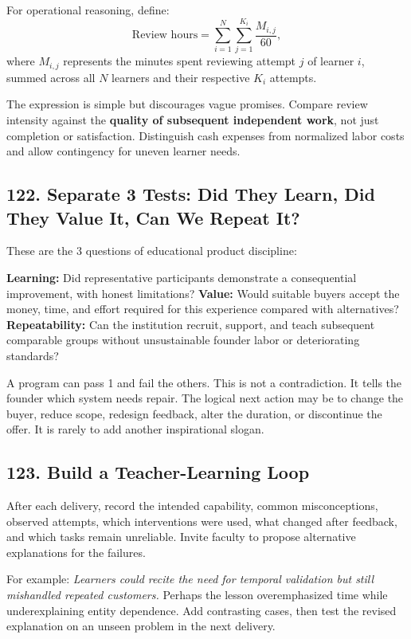 For operational reasoning, define:
\begin{equation}
\text{Review hours} = \sum_{i=1}^{N}\sum_{j=1}^{K_i} \frac{M_{i,j}}{60},
\end{equation}
where $M_{i,j}$ represents the minutes spent reviewing attempt $j$ of learner $i$, summed across all $N$ learners and their respective $K_i$ attempts.

The expression is simple but discourages vague promises. Compare review intensity against the \textbf{quality of subsequent independent work}, not just completion or satisfaction. Distinguish cash expenses from normalized labor costs and allow contingency for uneven learner needs.

\subsection*{122. Separate 3 Tests: Did They Learn, Did They Value It, Can We Repeat It?}

These are the 3 questions of educational product discipline:

\textbf{Learning:} Did representative participants demonstrate a consequential improvement, with honest limitations? \textbf{Value:} Would suitable buyers accept the money, time, and effort required for this experience compared with alternatives? \textbf{Repeatability:} Can the institution recruit, support, and teach subsequent comparable groups without unsustainable founder labor or deteriorating standards?

A program can pass 1 and fail the others. This is not a contradiction. It tells the founder which system needs repair. The logical next action may be to change the buyer, reduce scope, redesign feedback, alter the duration, or discontinue the offer. It is rarely to add another inspirational slogan.

\subsection*{123. Build a Teacher-Learning Loop}

After each delivery, record the intended capability, common misconceptions, observed attempts, which interventions were used, what changed after feedback, and which tasks remain unreliable. Invite faculty to propose alternative explanations for the failures.

For example: \emph{Learners could recite the need for temporal validation but still mishandled repeated customers.} Perhaps the lesson overemphasized time while underexplaining entity dependence. Add contrasting cases, then test the revised explanation on an unseen problem in the next delivery.

